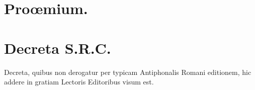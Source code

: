 \documentclass[vesperale_romanum.tex]{subfiles}
\begin{document}
\begin{NoHyper}
\vspace*{\fill}
{}

\vspace{\baselineskip}

{}



\vspace*{\fill}

{\par}


\vspace*{\fill}


  \makebox[0pt][l]%
  {\phantom{10.}} %

\newpage\null\thispagestyle{empty}

\newpage\null\thispagestyle{empty}\newpage
\end{NoHyper}

\frontmatter

\thispagestyle{empty}
\section*{Proœmium.}







\cleardoublepage

\section*{Decreta S.R.C.}

\thispagestyle{empty}
Decreta, quibus non derogatur per typicam Antiphonalis Romani editionem, hic addere in gratiam Lectoris Editoribus visum est.
\end{document}
